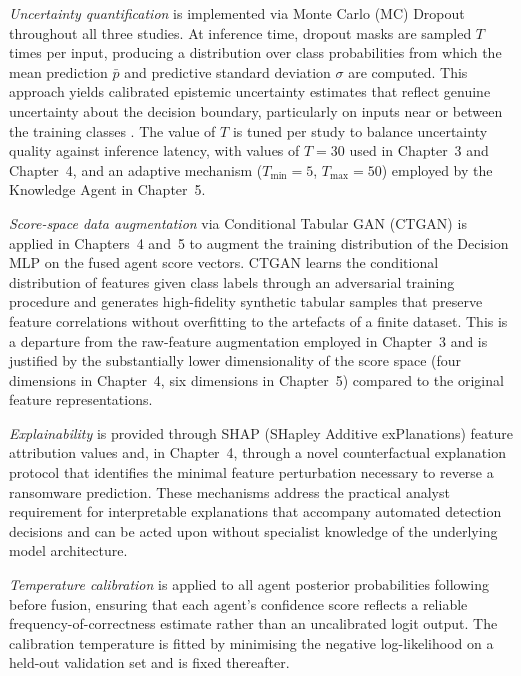 \emph{Uncertainty quantification} is implemented via Monte Carlo (MC) Dropout throughout all
three studies.
At inference time, dropout masks are sampled $T$ times per input, producing a distribution over
class probabilities from which the mean prediction $\bar{p}$ and predictive standard deviation
$\sigma$ are computed.
This approach yields calibrated epistemic uncertainty estimates that reflect genuine uncertainty
about the decision boundary, particularly on inputs near or between the training
classes \cite{gawlikowski2023Uncertainity}.
The value of $T$ is tuned per study to balance uncertainty quality against inference latency,
with values of $T=30$ used in Chapter~3 and Chapter~4, and an adaptive mechanism
($T_{\min}=5$, $T_{\max}=50$) employed by the Knowledge Agent in Chapter~5.

\emph{Score-space data augmentation} via Conditional Tabular GAN (CTGAN) \cite{xu2019ctgan} is
applied in Chapters~4 and~5 to augment the training distribution of the Decision MLP on the
fused agent score vectors.
CTGAN learns the conditional distribution of features given class labels through an adversarial
training procedure and generates high-fidelity synthetic tabular samples that preserve feature
correlations without overfitting to the artefacts of a finite dataset.
This is a departure from the raw-feature augmentation employed in Chapter~3 and is justified
by the substantially lower dimensionality of the score space (four dimensions in Chapter~4,
six dimensions in Chapter~5) compared to the original feature representations.

\emph{Explainability} is provided through SHAP (SHapley Additive exPlanations) feature
attribution values \cite{lundberg2017shap} and, in Chapter~4, through a novel counterfactual
explanation protocol that identifies the minimal feature perturbation necessary to reverse a
ransomware prediction.
These mechanisms address the practical analyst requirement for interpretable explanations that
accompany automated detection decisions and can be acted upon without specialist knowledge of
the underlying model architecture.

\emph{Temperature calibration} is applied to all agent posterior probabilities following
\cite{guo2017calibration} before fusion, ensuring that each agent's confidence score reflects
a reliable frequency-of-correctness estimate rather than an uncalibrated logit output.
The calibration temperature is fitted by minimising the negative log-likelihood on a held-out
validation set and is fixed thereafter.

